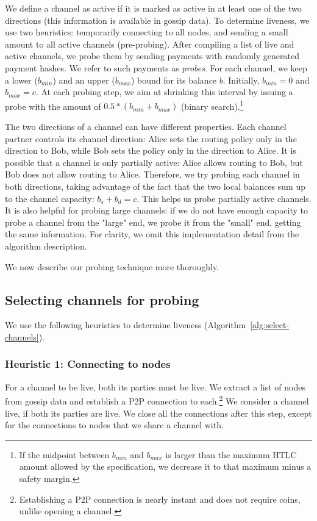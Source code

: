 We define a channel as active if it is marked as active in at least one of the two directions (this information is available in gossip data).
To determine liveness, we use two heuristics: temporarily connecting to all nodes, and sending a small amount to all active channels (pre-probing).
After compiling a list of live and active channels, we probe them by sending payments with randomly generated payment hashes.
We refer to such payments as \textit{probes}.
For each channel, we keep a lower ($b_{min}$) and an upper ($b_{max}$) bound for its balance $b$.
Initially, $b_{min}=0$ and $b_{max}=c$.
At each probing step, we aim at shrinking this interval by issuing a probe with the amount of $0.5 * (b_{min} + b_{max})$ (binary search).\footnote{If the midpoint between $b_{min}$ and $b_{max}$ is larger than the maximum HTLC amount allowed by the specification, we decrease it to that maximum minus a safety margin.}

The two directions of a channel can have different properties.
Each channel partner controls its channel direction: Alice sets the routing policy only in the direction to Bob, while Bob sets the policy only in the direction to Alice.
It is possible that a channel is only partially active: Alice allows routing to Bob, but Bob does not allow routing to Alice.
Therefore, we try probing each channel in both directions, taking advantage of the fact that the two local balances sum up to the channel capacity: $b_s + b_d = c$.
This helps us probe partially active channels.
It is also helpful for probing large channels: if we do not have enough capacity to probe a channel from the "large" end, we probe it from the "small" end, getting the same information.
For clarity, we omit this implementation detail from the algorithm description.

We now describe our probing technique more thoroughly.

\subsection{Selecting channels for probing}
We use the following heuristics to determine liveness (Algorithm~\ref{alg:select-channels}).

\subsubsection{Heuristic 1: Connecting to nodes}
For a channel to be live, both its parties must be live.
We extract a list of nodes from gossip data and establish a P2P connection to each.\footnote{Establishing a P2P connection is nearly instant and does not require coins, unlike opening a channel.}
We consider a channel live, if both its parties are live.
We close all the connections after this step, except for the connections to nodes that we share a channel with.

